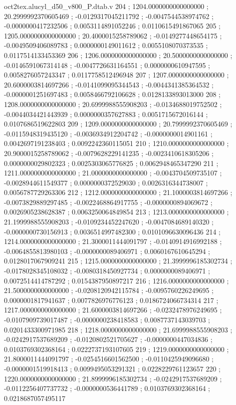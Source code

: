 \begin{filecontents}[overwrite]{oct2tex.alucyl_d50_v800_P.dtab.v}
204 ; 1204.0000000000000000 ; 20.2999992370605469 ; -0.0129317045211792 ; -0.0047544538974762 ; -0.0000000417232506 ; 0.0053114891052246 ; 0.0110615491867065
205 ; 1205.0000000000000000 ; 20.4000015258789062 ; -0.0149277448654175 ; -0.0049509406089783 ; 0.0000000149011612 ; 0.0055108070373535 ; 0.0117514133453369
206 ; 1206.0000000000000000 ; 20.5000000000000000 ; -0.0146591067314148 ; -0.0047726631164551 ; 0.0000000610947595 ; 0.0058276057243347 ; 0.0117758512496948
207 ; 1207.0000000000000000 ; 20.6000003814697266 ; -0.0141099095344543 ; -0.0044341385364532 ; -0.0000001251697483 ; 0.0058466792106628 ; 0.0128133893013000
208 ; 1208.0000000000000000 ; 20.6999988555908203 ; -0.0134688019752502 ; -0.0044034421443939 ; 0.0000000357627883 ; 0.0051715672016144 ; 0.0107686519622803
209 ; 1209.0000000000000000 ; 20.7999992370605469 ; -0.0115948319435120 ; -0.0036934912204742 ; -0.0000000014901161 ; 0.0042697191238403 ; 0.0092242360115051
210 ; 1210.0000000000000000 ; 20.9000015258789062 ; -0.0079628229141235 ; -0.0023410618305206 ; 0.0000000029802323 ; 0.0025303065776825 ; 0.0062948465347290
211 ; 1211.0000000000000000 ; 21.0000000000000000 ; -0.0043704509735107 ; -0.0028944611549377 ; 0.0000000372529030 ; 0.0026316344738007 ; 0.0056787729263306
212 ; 1212.0000000000000000 ; 21.1000003814697266 ; -0.0073829889297485 ; -0.0022468864917755 ; -0.0000000894069672 ; 0.0026905238628387 ; 0.0063250064849854
213 ; 1213.0000000000000000 ; 21.1999988555908203 ; -0.0109234452247620 ; -0.0047084689140320 ; -0.0000000730156913 ; 0.0036514997482300 ; 0.0101096630096436
214 ; 1214.0000000000000000 ; 21.3000011444091797 ; -0.0140914916992188 ; -0.0064855813980103 ; -0.0000000089406971 ; 0.0060167610645294 ; 0.0128017067909241
215 ; 1215.0000000000000000 ; 21.3999996185302734 ; -0.0178028345108032 ; -0.0080318450927734 ; 0.0000000089406971 ; 0.0072514414787292 ; 0.0154387950897217
216 ; 1216.0000000000000000 ; 21.5000000000000000 ; -0.0208120942115784 ; -0.0095760226249695 ; 0.0000001817941637 ; 0.0077826976776123 ; 0.0186724066734314
217 ; 1217.0000000000000000 ; 21.6000003814697266 ; -0.0232478976249695 ; -0.0107909739017487 ; -0.0000000238418583 ; 0.0087737143039703 ; 0.0201433300971985
218 ; 1218.0000000000000000 ; 21.6999988555908203 ; -0.0242917537689209 ; -0.0120802521705627 ; -0.0000000447034836 ; 0.0103769302368164 ; 0.0222737193107605
219 ; 1219.0000000000000000 ; 21.8000011444091797 ; -0.0254516601562500 ; -0.0110425949096680 ; -0.0000001519918413 ; 0.0099495053291321 ; 0.0228229761123657
220 ; 1220.0000000000000000 ; 21.8999996185302734 ; -0.0242917537689209 ; -0.0112256407737732 ; -0.0000000536441789 ; 0.0103769302368164 ; 0.0218687057495117

\end{filecontents}
